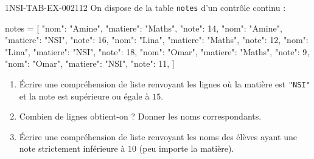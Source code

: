 \begin{exercice}{1NSI-TAB-EX-002}{1}{12}
On dispose de la table \lstinline{notes} d'un contrôle continu :
\begin{python}
notes = [
    {"nom": "Amine", "matiere": "Maths", "note": 14},
    {"nom": "Amine", "matiere": "NSI", "note": 16},
    {"nom": "Lina", "matiere": "Maths", "note": 12},
    {"nom": "Lina", "matiere": "NSI", "note": 18},
    {"nom": "Omar", "matiere": "Maths", "note": 9},
    {"nom": "Omar", "matiere": "NSI", "note": 11},
]
\end{python}
\begin{enumerate}
  \item Écrire une compréhension de liste renvoyant les lignes où la matière est \lstinline{"NSI"} et la note est supérieure ou égale à $15$.
  \item Combien de lignes obtient-on ? Donner les noms correspondants.
  \item Écrire une compréhension de liste renvoyant les noms des élèves ayant une note strictement inférieure à $10$ (peu importe la matière).
\end{enumerate}
\end{exercice}
